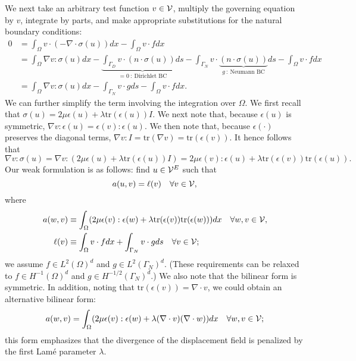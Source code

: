 We next take an arbitrary test function $v \in \mathcal{V}$, multiply the governing equation by $v$, integrate by parts, and make appropriate substitutions for the natural boundary conditions: 
\begin{align*}
  0 &= 
  \int_{\Omega} v \cdot (-\nabla \cdot \sigma(u) ) dx - \int_{\Omega} v \cdot f dx \\
  &=
  \int_{\Omega} \nabla v : \sigma (u) dx - \underbrace{ \int_{\Gamma_D} v \cdot ( n \cdot \sigma(u)) ds}_{= 0 \ : \ \text{Dirichlet BC}} - \int_{\Gamma_{N}} v \cdot \underbrace{ (n \cdot \sigma(u))}_{g \ : \ \text{Neumann BC}} ds - \int_{\Omega} v \cdot f dx \\
  &=
  \int_{\Omega} \nabla v : \sigma (u) dx - \int_{\Gamma_N} v \cdot g ds - \int_{\Omega} v \cdot f dx  .
\end{align*}
We can further simplify the term involving the integration over $\Omega$. We first recall that $\sigma(u) = 2\mu \epsilon(u) + \lambda \text{tr}(\epsilon(u)) I$.   We next note that, because $\epsilon(u)$ is symmetric, $\nabla v : \epsilon(u) = \epsilon(v) : \epsilon(u)$. We then note that,  because $\epsilon(\cdot)$ preserves the diagonal terms, $\nabla v: I = \text{tr}(\nabla v) =  \text{tr}(\epsilon(v))$. It hence follows that
\begin{equation*}
  \nabla v : \sigma(u) = \nabla v : (2 \mu \epsilon(u) + \lambda \text{tr}(\epsilon(u)) I )
  = 2 \mu \epsilon(v) : \epsilon(u) + \lambda \text{tr}(\epsilon(v)) \text{tr}(\epsilon(u)) .
\end{equation*}
Our weak formulation is as follows: find $u \in \mathcal{V}^E$ such that
\begin{equation}
  a(u,v) = \ell(v) \quad \forall v \in \mathcal{V},
  \label{eq:le_weak}
\end{equation}
where
\begin{align}
  a(w,v) &\equiv \int_{\Omega} ( 2 \mu \epsilon(v) : \epsilon(w) + \lambda \text{tr}(\epsilon(v)) \text{tr}(\epsilon(w)) ) dx \quad \forall w, v \in \mathcal{V}, \label{eq:le_a} \\
  \ell(v) &\equiv   \int_{\Omega} v \cdot f dx + \int_{\Gamma_N} v \cdot g ds \quad \forall v \in \mathcal{V} \label{eq:le_ell};
\end{align}
we assume $f \in L^2(\Omega)^d$ and $g \in L^2(\Gamma_N)^d$.  (These requirements can be relaxed to $f \in H^{-1}(\Omega)^d$ and $g \in H^{-1/2}(\Gamma_N)^d$.)  We also note that the bilinear form is symmetric. In addition, noting that $\text{tr}(\epsilon(v)) = \nabla \cdot v$, we could obtain an alternative bilinear form:
\begin{equation}
  a(w,v) = \int_{\Omega}  ( 2 \mu \epsilon(v) : \epsilon(w) + \lambda (\nabla \cdot v) (\nabla \cdot w) ) dx \quad \forall w, v \in \mathcal{V}; \label{eq:le_a_alt}
\end{equation}
this form emphasizes that the divergence of the displacement field is penalized by the first Lam\'e parameter $\lambda$.

